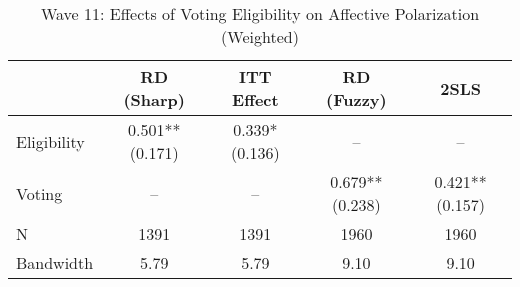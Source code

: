 \begin{table}[htbp]
\centering
\caption{Wave 11: Effects of Voting Eligibility on Affective Polarization (Weighted)}
\label{tab:wave11_w}
\begin{tabular}{lcccc}
\hline
 & RD (Sharp) & ITT Effect & RD (Fuzzy) & 2SLS \\
\hline
Eligibility & 0.501** (0.171) & 0.339* (0.136) & -- & -- \\
Voting & -- & -- & 0.679** (0.238) & 0.421** (0.157) \\
\hline
N & 1391 & 1391 & 1960 & 1960 \\
Bandwidth & 5.79 & 5.79 & 9.10 & 9.10 \\
\hline
\end{tabular}
\end{table}
